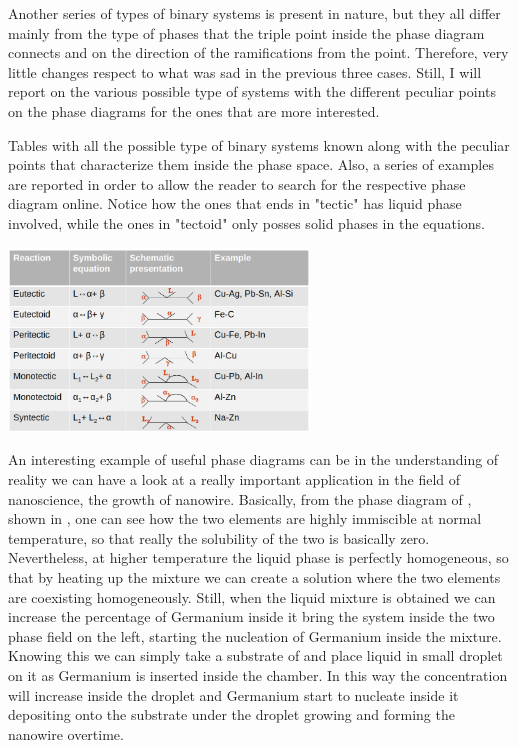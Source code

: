 \nt
{
    Another series of types of binary systems is present in nature, but they all differ mainly from the type of phases that the triple point inside the phase diagram connects and on the direction of the ramifications from the point. Therefore, very little changes respect to what was sad in the previous three cases. Still, I will report on  the various possible type of systems with the different peculiar points on the phase diagrams for the ones that are more interested.
}

\begin{table}
    \centering
    \caption
    {
        Tables with all the possible type of binary systems known along with the peculiar points that characterize them inside the phase space. Also, a series of examples are reported in order to allow the reader to search for the respective phase diagram online. Notice how the ones that ends in "tectic" has liquid phase involved, while the ones in "tectoid" only posses solid phases in the equations.
    }
    \label{tab:TabSys}
    \includegraphics[width=0.6\textwidth]{Immagini/TabSyst.png}
\end{table}

{
    An interesting example of useful phase diagrams can be in the understanding of reality we can have a look at a really important application in the field of nanoscience, the growth of nanowire. Basically, from the phase diagram of , shown in , one can see how the two elements are highly immiscible at normal temperature, so that really the solubility of the two is basically zero. Nevertheless, at higher temperature the liquid phase is perfectly homogeneous, so that by heating up the mixture we can create a solution where the two elements are coexisting homogeneously. Still, when the liquid mixture is obtained we can increase the percentage of Germanium inside it bring the system inside the two phase field on the left, starting the nucleation of Germanium inside the mixture. Knowing this we can simply take a substrate of  and place liquid  in small droplet on it as Germanium is inserted inside the chamber. In this way the  concentration will increase inside the droplet and Germanium start to nucleate inside it depositing onto the substrate under the droplet growing and forming the nanowire overtime.
}

